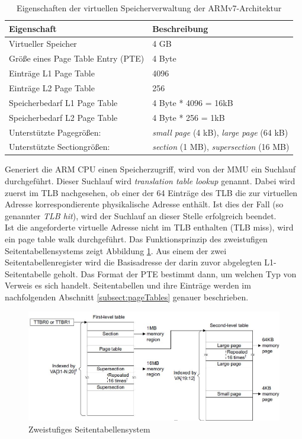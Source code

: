 \begin{table}[H]
\begin{tabular}{p{7cm} | p{7cm}}
  \textbf{Eigenschaft} & \textbf{Beschreibung} \\ \hline
  Virtueller Speicher & 4 GB\\  
  Größe eines Page Table Entry (PTE) & 4 Byte \\
  Einträge L1 Page Table & 4096\\
  Einträge L2 Page Table & 256\\
  Speicherbedarf L1 Page Table & 4 Byte * 4096 = 16kB \\
  Speicherbedarf L2 Page Table & 4 Byte * 256 = 1kB\\
  Unterstützte Pagegrößen: & \emph{small page} (4 kB), \emph{large page} (64 kB)\\
  Unterstützte Sectiongrößen: & \emph{section} (1 MB), \emph{supersection} (16 MB)\\
 \end{tabular}
 \caption{Eigenschaften der virtuellen Speicherverwaltung der ARMv7-Architektur}
 \label{table:GeneralVirtualMemory}
\end{table}

Generiert die ARM CPU einen Speicherzugriff, wird von der MMU ein Suchlauf durchgeführt. Dieser Suchlauf wird \emph{translation table lookup} genannt. Dabei wird zuerst im \ac{TLB} nachgesehen, ob einer der 64 Einträge des TLB die zur virtuellen Adresse korrespondierente physikalische Adresse enthält. Ist dies der Fall (so genannter \emph{TLB hit}), wird der Suchlauf an dieser Stelle erfolgreich beendet.\\

Ist die angeforderte virtuelle Adresse nicht im TLB enthalten (TLB miss), wird ein page table walk durchgeführt. Das Funktionsprinzip des zweistufigen Seitentabellensystems zeigt Abbildung \ref{fig:2levelTableSystem}. Aus einem der zwei Seitentabellenregister wird die Basisadresse der darin zuvor abgelegten L1-Seitentabelle geholt. Das Format der PTE bestimmt dann, um welchen Typ von Verweis es sich handelt. Seitentabellen und ihre Einträge werden im nachfolgenden Abschnitt \ref{subsect:pageTables} genauer beschrieben.\\

\begin{figure}[H]
	\includegraphics[scale=0.7]{figures/addressTranslation}
	\caption{Zweistufiges Seitentabellensystem \cite[S. B3-1325]{ARM:ARM}}
	\label{fig:2levelTableSystem}
\end{figure}

